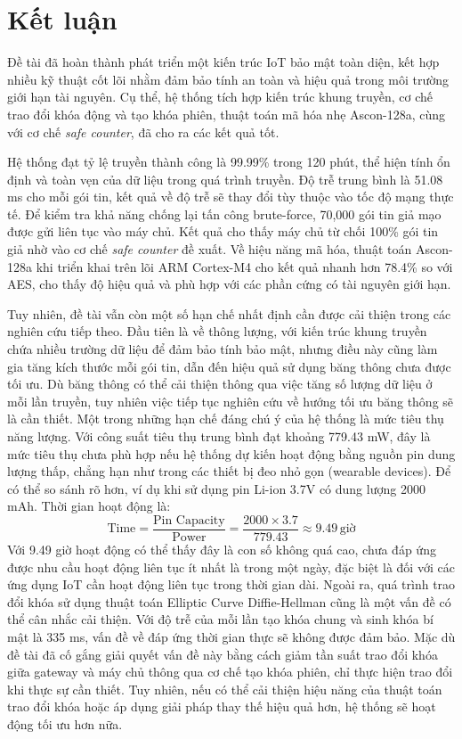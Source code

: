 \chapter{Kết luận}
\label{Chapter5}

Đề tài đã hoàn thành phát triển một kiến trúc IoT bảo mật toàn diện, kết hợp nhiều kỹ thuật cốt lõi nhằm đảm bảo tính an toàn và hiệu quả trong môi trường giới hạn tài nguyên. 
Cụ thể, hệ thống tích hợp kiến trúc khung truyền, cơ chế trao đổi khóa động và tạo khóa phiên, thuật toán mã hóa nhẹ Ascon-128a, cùng với cơ chế \textit{safe counter}, đã
cho ra các kết quả tốt. 

Hệ thống đạt tỷ lệ truyền thành công là 99.99\% trong 120 phút, thể hiện tính ổn định và toàn vẹn của dữ liệu trong quá trình truyền.
Độ trễ trung bình là 51.08 ms cho mỗi gói tin, kết quả về độ trễ sẽ thay đổi tùy thuộc vào tốc độ mạng thực tế. Để kiểm tra khả năng chống lại tấn công brute-force, 70,000
gói tin giả mạo được gửi liên tục vào máy chủ. Kết quả cho thấy máy chủ từ chối 100\% gói tin giả nhờ vào cơ chế \textit{safe counter} đề xuất. 
Về hiệu năng mã hóa, thuật toán Ascon-128a khi triển khai trên lõi ARM Cortex-M4 cho kết quả nhanh hơn 78.4\% so với AES, cho thấy độ hiệu quả 
và phù hợp với các phần cứng có tài nguyên giới hạn. 

Tuy nhiên, đề tài vẫn còn một số hạn chế nhất định cần được cải thiện trong các nghiên cứu tiếp theo. Đầu tiên là về thông lượng, với kiến trúc khung truyền chứa nhiều trường dữ liệu để đảm bảo tính bảo mật, nhưng điều này cũng làm gia tăng kích thước mỗi gói tin, dẫn đến hiệu quả sử dụng băng thông chưa được tối ưu. Dù băng thông có thể cải thiện thông qua việc tăng số lượng dữ liệu ở mỗi lần truyền, tuy nhiên việc tiếp tục nghiên cứu về hướng tối ưu băng thông sẽ là cần thiết.
Một trong những hạn chế đáng chú ý của hệ thống là mức tiêu thụ năng lượng. Với công suất tiêu thụ trung bình đạt khoảng 779.43 mW, đây là mức tiêu thụ chưa phù hợp nếu hệ thống dự kiến hoạt động bằng nguồn pin dung lượng thấp, chẳng hạn như trong các thiết bị đeo nhỏ gọn (wearable devices). Để có thể so sánh rõ hơn, ví dụ khi sử dụng pin Li-ion 3.7V 
có dung lượng 2000 mAh. Thời gian hoạt động là:
\[
    \text{Time} = \frac{\text{Pin Capacity}}{\text{Power}} = \frac{2000 \times 3.7 }{779.43} \approx 9.49 \, \text{giờ}
\]
Với 9.49 giờ hoạt động có thể thấy đây là con số không quá cao, chưa đáp ứng được nhu cầu hoạt động liên tục ít nhất là trong một ngày, đặc biệt là đối với các ứng dụng IoT cần hoạt động liên tục trong thời gian dài. Ngoài ra, quá trình trao đổi khóa sử dụng thuật toán
Elliptic Curve Diffie-Hellman cũng là một vấn đề có thể cân nhắc cải thiện. Với độ trễ của mỗi lần tạo khóa chung và sinh khóa bí mật là 335 ms, vấn đề về đáp ứng thời gian thực sẽ
không được đảm bảo. Mặc dù đề tài đã cố gắng giải quyết vấn đề này bằng cách giảm tần suất trao đổi khóa giữa gateway và máy chủ thông qua cơ chế tạo khóa phiên, chỉ thực hiện trao đổi khi thực sự cần thiết. Tuy nhiên, nếu có thể cải thiện hiệu năng của thuật toán trao đổi khóa hoặc áp dụng giải pháp thay thế hiệu quả hơn, hệ thống sẽ hoạt động tối ưu hơn nữa.

